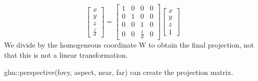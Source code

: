 			\begin{equation}
				\begin{bmatrix} x\\ y \\z  \\ \frac{z} {d}  \end{bmatrix} = \begin{bmatrix} 1& 0& 0& 0\\ 
			 		                0& 1& 0& 0\\
			 		                0& 0& 1& 0\\
			 		                0& 0& \frac{1}{d} & 0\end{bmatrix} \begin{bmatrix} x \\ y \\ z \\ 1 \end{bmatrix}
			\end{equation}
		We divide by the homogeneous coordinate W to obtain the final projection, not that this is not a linear transformation. 

		glm::perspective(fovy, aspect, near, far) can create the projection matrix. 




